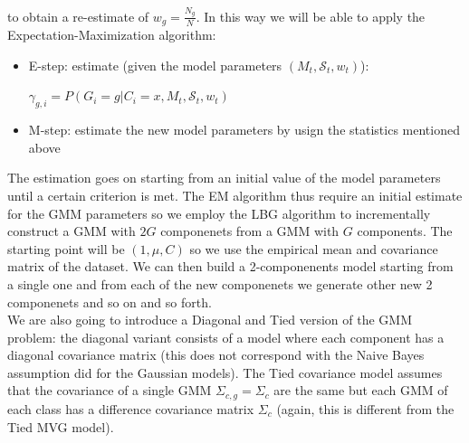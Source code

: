 \documentclass[10pt, a4paper, twocolumn]{article} %
\begin{document}
to obtain a re-estimate of $w_g = \frac{N_g}{N}$.
In this way we will be able to apply the Expectation-Maximization algorithm:
\begin{itemize}
	\item E-step: estimate (given the model parameters $(M_t,\mathcal{S}_t,w_t)$):
			\begin{center}
				$\gamma_{g,i}=P(G_i=g|C_i=x,M_t,\mathcal{S}_t,w_t)$ 
			\end{center}
	\item M-step: estimate the new model parameters by usign the statistics mentioned above
\end{itemize}
The estimation goes on starting from an initial value of the model parameters until a certain
criterion is met. The EM algorithm thus require an initial estimate for the GMM parameters so
we employ the LBG algorithm to incrementally construct a  GMM with $2G$ componenets from a 
GMM with $G$ components. The starting point will be $(1, \mu, C)$ so we use the empirical
mean and covariance matrix of the dataset. We can then build a 2-componenents model starting from
a single one and from each of the new componenets we generate other new 2 componenets and so on and so forth.
\\We are also going to introduce a Diagonal and Tied version of the GMM problem: the diagonal
variant consists of a model where each component has a diagonal covariance matrix (this does
not correspond with the Naive Bayes assumption did for the Gaussian models). The Tied covariance
model assumes that the covariance of a single GMM $\Sigma_{c,g} = \Sigma_c$ are the same but
each GMM of each class has a difference covariance matrix $\Sigma_c$ (again, this is different
from the Tied MVG model).
\end{document}
